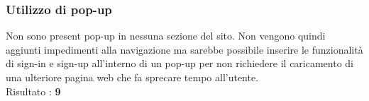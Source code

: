 \subsubsection{Utilizzo di pop-up}
Non sono present pop-up in nessuna sezione del sito. Non vengono quindi aggiunti
impedimenti alla navigazione ma sarebbe possibile inserire le funzionalità di
sign-in e sign-up all'interno di un pop-up per non richiedere il caricamento
di una ulteriore pagina web che fa sprecare tempo all'utente. \\
Risultato : \textbf{9}
